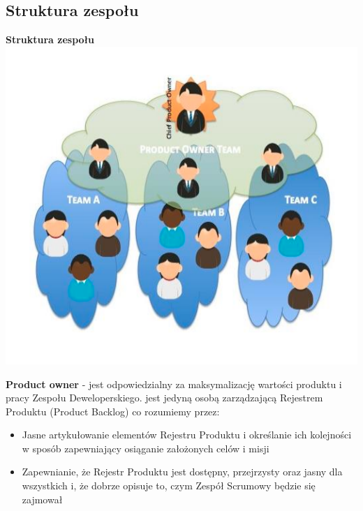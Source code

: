 \documentclass[12pt]{article}
\begin{document}
    \subsection{Struktura zespołu}

    \begin{definition}
        \textbf{Struktura zespołu} \\
        \includegraphics[width=\linewidth]{scrum_teams.png}
    \end{definition}

    \begin{definition}
        \textbf{Product owner} - jest odpowiedzialny za maksymalizację wartości produktu i pracy Zespołu Deweloperskiego. jest jedyną osobą zarządzającą Rejestrem Produktu (Product Backlog) co rozumiemy przez:
        \begin{itemize}
            \item Jasne artykułowanie elementów Rejestru Produktu i określanie ich kolejności w sposób zapewniający osiąganie założonych celów i misji
            \item Zapewnianie, że Rejestr Produktu jest dostępny, przejrzysty oraz jasny dla wszystkich i, że dobrze opisuje to, czym Zespół Scrumowy będzie się zajmował
        \end{itemize}
    \end{definition}
\end{document}
